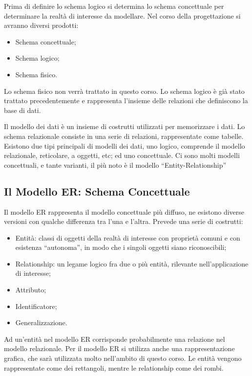 \documentclass{article}
\numberwithin{equation}{subsection}
\begin{document}
Prima di definire lo schema logico si determina lo schema concettuale per determinare la realtà di interesse da modellare. Nel corso della progettazione si avranno 
diversi prodotti:
\begin{itemize}
    \item Schema concettuale;
    \item Schema logico;
    \item Schema fisico. 
\end{itemize}

Lo schema fisico non verrà trattato in questo corso. Lo schema logico è già stato trattato precedentemente e rappresenta l'insieme delle relazioni che definiscono 
la base di dati. 

Il modello dei dati è un insieme di costrutti utilizzati per memorizzare i dati. Lo schema relazionale consiste in una serie di relazioni, rappresentate come tabelle. 
Esistono due tipi principali di modelli dei dati, uno logico, comprende il modello relazionale, reticolare, a oggetti, etc; ed uno concettuale. 
Ci sono molti modelli concettuali, e tante varianti, il più noto è il modello ``Entity-Relationship''

\subsection{Il Modello ER: Schema Concettuale}

Il modello ER rappresenta il modello concettuale più diffuso, ne esistono diverse versioni con qualche differenza tra l'una e l'altra. Prevede una serie di costrutti:
\begin{itemize}
    \item Entità: classi di oggetti della realtà di interesse con proprietà comuni e con esistenza ``autonoma'', in modo che i singoli oggetti siano riconoscibili;
    \item Relationship: un legame logico fra due o più entità, rilevante nell'applicazione di interesse;
    \item Attributo;
    \item Identificatore;
    \item Generalizzazione. 
\end{itemize}

Ad un'entità nel modello ER corrisponde probabilmente una relazione nel modello relazionale. 
Per il modello ER si utilizza anche una rappresentazione grafica, che sarà utilizzata molto nell'ambito di questo corso. Le entità vengono rappresentate come dei 
rettangoli, mentre le relationship come dei rombi. 
\end{document}
